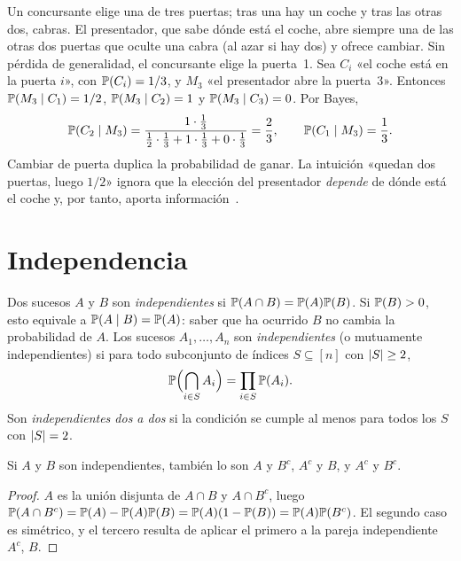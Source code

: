 \begin{ejemplo}\label{ej:t4-monty}
Un concursante elige una de tres puertas; tras una hay un coche y tras las otras dos, cabras. El presentador, que sabe dónde está el coche, abre siempre una de las otras dos puertas que oculte una cabra (al azar si hay dos) y ofrece cambiar. Sin pérdida de generalidad, el concursante elige la puerta~1. Sea $C_i$ «el coche está en la puerta $i$», con $\mathbb{P}(C_i)=1/3$, y $M_3$ «el presentador abre la puerta~3». Entonces $\mathbb{P}(M_3\mid C_1)=1/2$, $\mathbb{P}(M_3\mid C_2)=1$ y $\mathbb{P}(M_3\mid C_3)=0$. Por Bayes,
\[
\mathbb{P}(C_2\mid M_3)=\frac{1\cdot\frac13}{\frac12\cdot\frac13+1\cdot\frac13+0\cdot\frac13}=\frac23,\qquad\mathbb{P}(C_1\mid M_3)=\frac13.
\]
Cambiar de puerta duplica la probabilidad de ganar. La intuición «quedan dos puertas, luego $1/2$» ignora que la elección del presentador \emph{depende} de dónde está el coche y, por tanto, aporta información~\cite[§16.1 y §17.1]{mcs}.
\end{ejemplo}

\section{Independencia}

\begin{definicion}[Independencia]
Dos sucesos $A$ y $B$ son \emph{independientes} si $\mathbb{P}(A\cap B)=\mathbb{P}(A)\mathbb{P}(B)$. Si $\mathbb{P}(B)>0$, esto equivale a $\mathbb{P}(A\mid B)=\mathbb{P}(A)$: saber que ha ocurrido $B$ no cambia la probabilidad de $A$. Los sucesos $A_1,\dots,A_n$ son \emph{independientes} (o mutuamente independientes) si para todo subconjunto de índices $S\subseteq[n]$ con $\lvert S\rvert\ge2$,
\[
\mathbb{P}\Bigl(\bigcap_{i\in S}A_i\Bigr)=\prod_{i\in S}\mathbb{P}(A_i).
\]
Son \emph{independientes dos a dos} si la condición se cumple al menos para todos los $S$ con $\lvert S\rvert=2$.
\end{definicion}

\begin{proposicion}\label{prop:t4-complementos}
Si $A$ y $B$ son independientes, también lo son $A$ y $B^{c}$, $A^{c}$ y $B$, y $A^{c}$ y $B^{c}$.
\end{proposicion}

\begin{proof}
$A$ es la unión disjunta de $A\cap B$ y $A\cap B^{c}$, luego $\mathbb{P}(A\cap B^{c})=\mathbb{P}(A)-\mathbb{P}(A)\mathbb{P}(B)=\mathbb{P}(A)(1-\mathbb{P}(B))=\mathbb{P}(A)\mathbb{P}(B^{c})$. El segundo caso es simétrico, y el tercero resulta de aplicar el primero a la pareja independiente $A^{c}$, $B$.
\end{proof}

